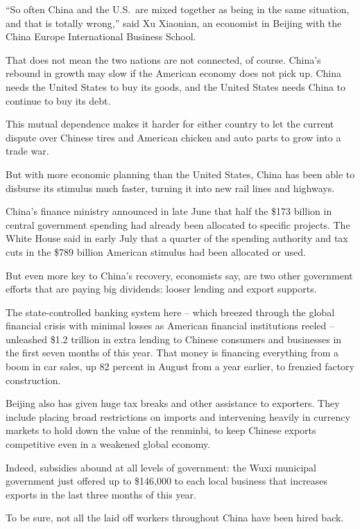 ﻿\documentclass[12pt]{article}
\begin{document}
``So often China and the U.S.~are mixed together as being in the same situation, and that is totally
wrong,'' said Xu Xiaonian, an economist in Beijing with the China Europe International Business
School.

That does not mean the two nations are not connected, of course. China's rebound in growth may slow
if the American economy does not pick up. China needs the United States to buy its goods, and the
United States needs China to continue to buy its debt.

This mutual dependence makes it harder for either country to let the current dispute over Chinese
tires and American chicken and auto parts to grow into a trade war.

But with more economic planning than the United States, China has been able to disburse its stimulus
much faster, turning it into new rail lines and highways.

China's finance ministry announced in late June that half the \$173 billion in central government
spending had already been allocated to specific projects. The White House said in early July that a
quarter of the spending authority and tax cuts in the \$789 billion American stimulus had been
allocated or used.

But even more key to China's recovery, economists say, are two other government efforts that are
paying big dividends: looser lending and export supports.

The state-controlled banking system here -- which breezed through the global financial crisis with
minimal losses as American financial institutions reeled -- unleashed \$1.2 trillion in extra
lending to Chinese consumers and businesses in the first seven months of this year. That money is
financing everything from a boom in car sales, up 82 percent in August from a year earlier, to
frenzied\cite{frenzied} factory construction.

Beijing also has given huge tax breaks and other assistance to exporters. They include placing broad
restrictions on imports and intervening heavily in currency markets to hold down the value of the
renminbi, to keep Chinese exports competitive even in a weakened global economy.

Indeed, subsidies abound at all levels of government: the Wuxi municipal government just offered up
to \$146,000 to each local business that increases exports in the last three months of this year.

To be sure, not all the laid off workers throughout China have been hired back.
\end{document}
